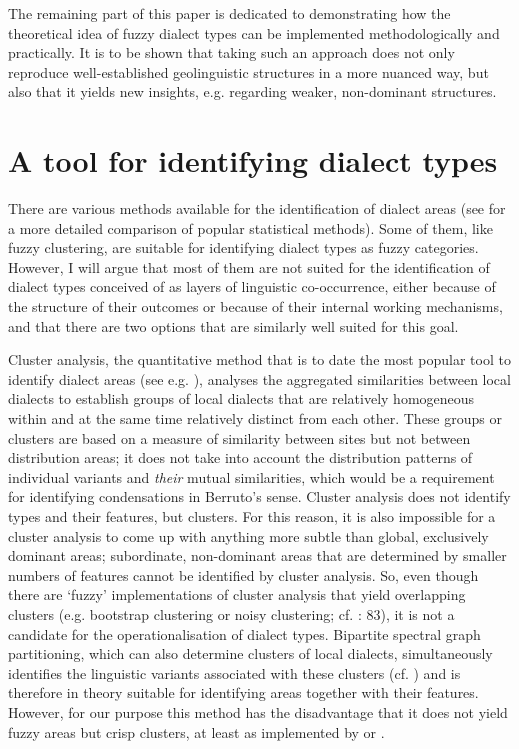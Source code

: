 \documentclass[output=paper]{LSP/langsci}
\begin{document}
The remaining part of this paper is dedicated to demonstrating how the theoretical idea of fuzzy dialect types can be implemented methodologically and practically. It is to be shown that taking such an approach does not only reproduce well-established geolinguistic structures in a more nuanced way, but also that it yields new insights, e.g. regarding weaker, non-dominant structures.

\section{A tool for identifying dialect types}
There are various methods available for the identification of dialect areas (see \citealt{grieve_comparison_2014} for a more detailed comparison of popular statistical methods). Some of them, like fuzzy clustering, are suitable for identifying dialect types as fuzzy categories. However, I will argue that most of them are not suited for the identification of dialect types conceived of as layers of linguistic co-occurrence, either because of the structure of their outcomes or because of their internal working mechanisms, and that there are two options that are similarly well suited for this goal.

Cluster analysis, the quantitative method that is to date the most popular tool to identify dialect areas (see e.g. \citealt[17--29]{goebl_stammbaum_1983,prokic_recognizing_2008,prokic_families_2010}), analyses the aggregated similarities between local dialects to establish groups of local dialects that are relatively homogeneous within and at the same time relatively distinct from each other. These groups or clusters are based on a measure of similarity between sites but not between distribution areas; it does not take into account the distribution patterns of individual variants and \textit{their} mutual similarities, which would be a requirement for identifying condensations in Berruto’s sense. Cluster analysis does not identify types and their features, but clusters. For this reason, it is also impossible for a cluster analysis to come up with anything more subtle than global, exclusively dominant areas; subordinate, non-dominant areas that are determined by smaller numbers of features cannot be identified by cluster analysis. So, even though there are ‘fuzzy’ implementations of cluster analysis that yield overlapping clusters (e.g. bootstrap clustering or noisy clustering; cf. \citealt{nerbonne_gabmap_2011}: 83), it is not a candidate for the operationalisation of dialect types. Bipartite spectral graph partitioning, which can also determine clusters of local dialects, simultaneously identifies the linguistic variants associated with these clusters (cf. \citealt{wieling_bipartite_2011}) and is therefore in theory suitable for identifying areas together with their features. However, for our purpose this method has the disadvantage that it does not yield fuzzy areas but crisp clusters, at least as implemented by \citet{wieling_bipartite_2011} or \citet{wieling_analyzing_2013}. 
\end{document}
